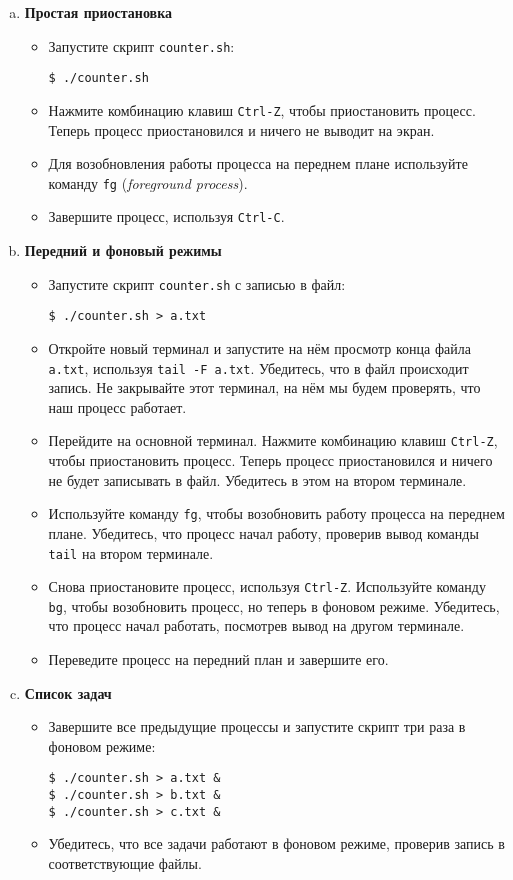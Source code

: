 \documentclass{article}
\begin{document}
\begin{enumerate}[(a)]
\item \textbf{Простая приостановка}
\begin{itemize}[leftmargin=1mm,label={--}]
\item Запустите скрипт \texttt{counter.sh}:
\begin{lstlisting}
$ ./counter.sh
\end{lstlisting}
\item Нажмите комбинацию клавиш \texttt{Ctrl-Z}, чтобы приостановить процесс. Теперь процесс приостановился и ничего не выводит на экран.
\item Для возобновления работы процесса на переднем плане используйте команду \texttt{fg} (\textit{foreground process}).
\item Завершите процесс, используя \texttt{Ctrl-C}.
\end{itemize}


\item \textbf{Передний и фоновый режимы}
\begin{itemize}[leftmargin=1mm,label={--}]
\item Запустите скрипт \texttt{counter.sh} с записью в файл:
\begin{lstlisting}
$ ./counter.sh > a.txt
\end{lstlisting}
\item Откройте новый терминал и запустите на нём просмотр конца файла \texttt{a.txt}, используя \texttt{tail -F a.txt}. Убедитесь, что в файл происходит запись. Не закрывайте этот терминал, на нём мы будем проверять, что наш процесс работает.
\item Перейдите на основной терминал. Нажмите комбинацию клавиш \texttt{Ctrl-Z}, чтобы приостановить процесс. Теперь процесс приостановился и ничего не будет записывать в файл. Убедитесь в этом на втором терминале. 
\item Используйте команду \texttt{fg}, чтобы возобновить работу процесса на переднем плане. Убедитесь, что процесс начал работу, проверив вывод команды \texttt{tail} на втором терминале.
\item Снова приостановите процесс, используя \texttt{Ctrl-Z}. Используйте команду \texttt{bg}, чтобы возобновить процесс, но теперь в фоновом режиме. Убедитесь, что процесс начал работать, посмотрев вывод на другом терминале.
\item Переведите процесс на передний план и завершите его.
\end{itemize}


\newpage
\item \textbf{Список задач}
\begin{itemize}[leftmargin=1mm,label={--}]
\item Завершите все предыдущие процессы и запустите скрипт три раза в фоновом режиме:
\begin{lstlisting}
$ ./counter.sh > a.txt &
$ ./counter.sh > b.txt &
$ ./counter.sh > с.txt &
\end{lstlisting}
\item Убедитесь, что все задачи работают в фоновом режиме, проверив запись в соответствующие файлы.


\end{itemize}
\end{enumerate}
\end{document}
